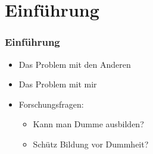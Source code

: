 \section{Einführung}

\begin{frame}
	\frametitle{Einführung}
	\begin{itemize}
		\item Das Problem mit den Anderen
		\item Das Problem mit mir
		\item Forschungsfragen:
		\begin{itemize}
			\item Kann man Dumme ausbilden?
			\item Schütz Bildung vor Dummheit?
		\end{itemize}
	\end{itemize}
\end{frame}
